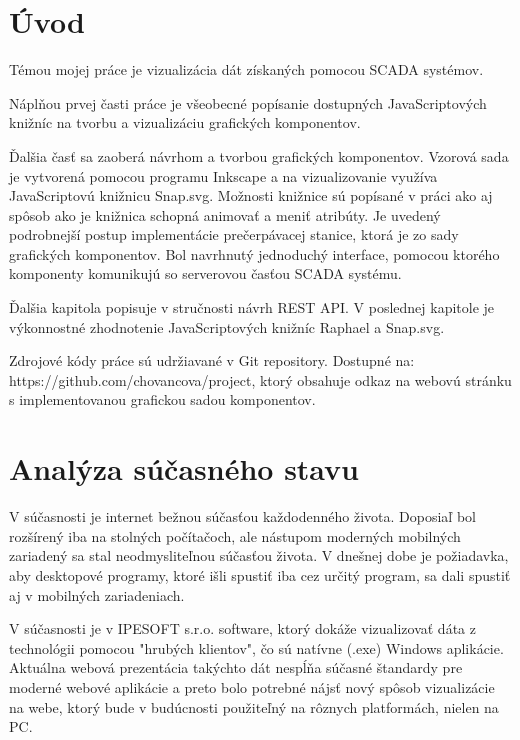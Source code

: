 \chapter*{Úvod}

Témou mojej práce je vizualizácia dát získaných pomocou SCADA systémov. 

Náplňou prvej časti práce je všeobecné popísanie dostupných JavaScriptových knižníc na tvorbu a vizualizáciu grafických komponentov. 

Ďalšia časť sa zaoberá návrhom a tvorbou grafických komponentov. Vzorová sada je vytvorená pomocou programu Inkscape a na vizualizovanie využíva JavaScriptovú knižnicu Snap.svg. Možnosti knižnice sú popísané v práci ako aj spôsob ako je knižnica schopná animovať a meniť atribúty. Je uvedený podrobnejší postup implementácie prečerpávacej stanice, ktorá je zo sady grafických komponentov. Bol navrhnutý jednoduchý interface, pomocou ktorého komponenty komunikujú so serverovou časťou SCADA systému. 

Ďalšia kapitola popisuje v stručnosti návrh REST API. V poslednej kapitole je výkonnostné zhodnotenie JavaScriptových knižníc Raphael a Snap.svg. 

Zdrojové kódy práce sú udržiavané v Git repository.\cite{github} Dostupné na:  \\https://github.com/chovancova/project, ktorý obsahuje odkaz na webovú stránku s implementovanou grafickou sadou komponentov. \\ 


\chapter{Analýza súčasného stavu}

V súčasnosti je internet bežnou súčasťou každodenného života. Doposiaľ bol rozšírený iba na stolných počítačoch, ale nástupom moderných mobilných zariadený sa stal neodmysliteľnou súčasťou života. V dnešnej dobe je požiadavka, aby desktopové programy, ktoré išli spustiť iba cez určitý program, sa dali spustiť aj v mobilných zariadeniach. 

V súčasnosti je v IPESOFT s.r.o. software, ktorý dokáže vizualizovať dáta z technológii pomocou "hrubých klientov",  čo sú natívne (.exe) Windows aplikácie. Aktuálna webová prezentácia takýchto dát nespĺňa súčasné štandardy pre moderné webové aplikácie a preto bolo potrebné nájsť nový spôsob vizualizácie na webe, ktorý bude v budúcnosti použiteľný na rôznych platformách, nielen na PC. 




